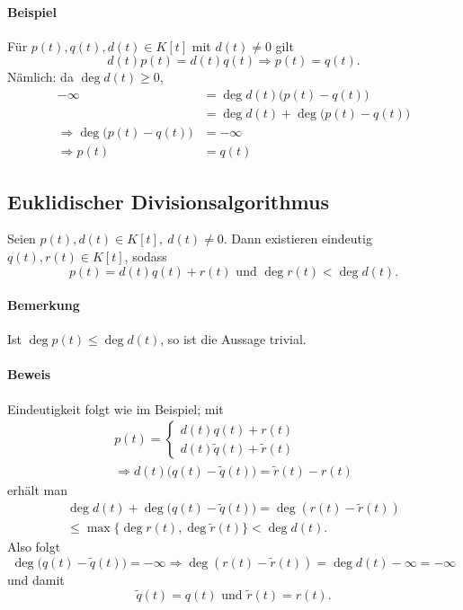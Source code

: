 
\paragraph{Beispiel}
	Für $ p(t),q(t),d(t)\in K[t] $ mit $ d(t)\neq 0 $ gilt
		\[ d(t)p(t) = d(t)q(t)\Rightarrow p(t)=q(t). \]
	Nämlich: da $ \deg d(t) \geq 0$,
		\begin{align*}
			-\infty &= \deg d(t)\big(p(t)-q(t)\big)\\
			&= \deg d(t)+ \deg\big(p(t)-q(t)\big)\\
			\Rightarrow \deg\big(p(t)-q(t)\big) &= -\infty\\
			\Rightarrow p(t)&=q(t)
		\end{align*}
\subsection{Euklidischer Divisionsalgorithmus}
	\begin{Satz}
	Seien $ p(t), d(t) \in K[t],\ d(t) \neq 0$. Dann existieren eindeutig $ q(t), r(t) \in K[t] $, sodass
		\[ p(t)= d(t)q(t) + r(t) \text{ und } \deg r(t) < \deg d(t). \]
	\end{Satz}
\paragraph{Bemerkung}
	Ist $ \deg p(t)\leq \deg d(t) $, so ist die Aussage trivial.
\paragraph{Beweis}
	Eindeutigkeit folgt wie im Beispiel; mit
		\begin{gather*}
		p(t) =
			\begin{cases}
				d(t)q(t)+r(t)\\
				d(t)\tilde{q}(t)+\tilde{r}(t)
			\end{cases}\\
		\Rightarrow d(t)\big(q(t)-\tilde{q}(t)\big) = \tilde{r}(t)-r(t)
		\end{gather*}
	erhält man
		\begin{gather*}
			\deg d(t) + \deg \big(q(t)-\tilde{q}(t)\big) = \deg (r(t)-\tilde{r}(t))\\
			\leq \max \{\deg r(t), \deg \tilde{r} (t)\} < \deg d(t).
		\end{gather*}
	Also folgt
		\[ \deg\big(q(t)-\tilde{q}(t)\big) = -\infty \Rightarrow \deg (r(t)-\tilde{r}(t)) = \deg d(t) -\infty = - \infty \]
	und damit
		\[ \tilde{q}(t)=q(t) \text{ und }\tilde{r}(t) = r(t). \]
	
